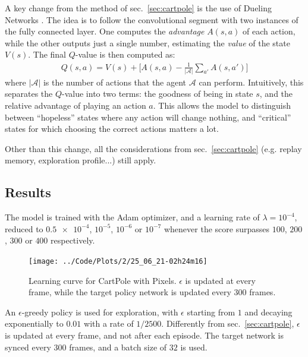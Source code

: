 \documentclass[11pt,a4paper]{scrartcl}
\newcommand{\q}[1]{``#1''}
\begin{document}
A key change from the method of sec.~\ref{sec:cartpole} is the use of Dueling Networks \cite{dueling_networks}. The idea is to follow the convolutional segment with two instances of the fully connected layer. One computes the \textit{advantage} $A(s,a)$ of each action, while the other outputs just a single number, estimating the \textit{value} of the state $V(s)$. The final $Q$-value is then computed as:
\begin{align*}
    Q(s, a) = V(s) + \Big[ A(s,a) - \frac{1}{|\mathcal{A}|} \sum_{a'} A(s,a') \Big]
\end{align*}
where $|\mathcal{A}|$ is the number of actions that the agent $\mathcal{A}$ can perform. Intuitively, this separates the $Q$-value into two terms: the goodness of being in state $s$, and the relative advantage of playing an action $a$. This allows the model to distinguish between \q{hopeless} states where any action will change nothing, and \q{critical} states for which choosing the correct actions matters a lot.

Other than this change, all the considerations from sec.~\ref{sec:cartpole} (e.g. replay memory, exploration profile...) still apply.



\subsection{Results}


The model is trained with the Adam optimizer, and a learning rate of $\lambda = 10^{-4}$, reduced to $\num{0.5e-4}$, $10^{-5}$, $10^{-6}$ or $10^{-7}$ whenever the score surpasses $100$, $200$, $300$ or $400$ respectively.

\begin{figure}[H]
    \centering
    \texttt{[image: ../Code/Plots/2/25\_06\_21-02h24m16]}
    \caption{Learning curve for CartPole with Pixels. $\epsilon$ is updated at every frame, while the target policy network is updated every $300$ frames. \label{fig:cartpole_pixels_lr}}
\end{figure}

An $\epsilon$-greedy policy is used for exploration, with $\epsilon$ starting from $1$ and decaying exponentially to $0.01$ with a rate of $1/2500$. Differently from sec.~\ref{sec:cartpole}, $\epsilon$ is updated at every frame, and not after each episode. The target network is synced every $300$ frames, and a batch size of $32$ is used. 

\medskip
\end{document}
